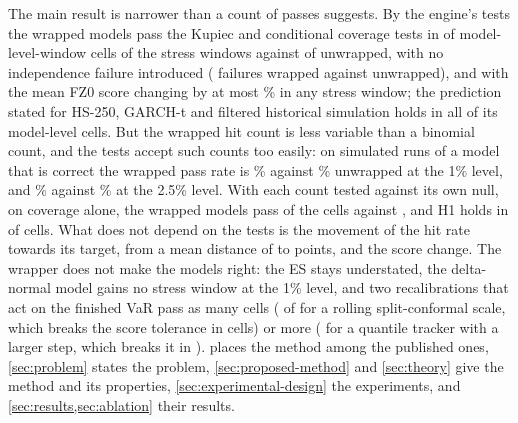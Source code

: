 The main result is narrower than a count of passes suggests. By the engine's tests the wrapped models pass the Kupiec and conditional coverage tests in \tenPassAci{} of \tenRuns{} model-level-window cells of the stress windows against \tenPassUnw{} of \tenRuns{} unwrapped, with no independence failure introduced (\tenIndFailAci{} failures wrapped against \tenIndFailUnw{} unwrapped), and with the mean FZ0 score changing by at most \tenWorstFz\% in any stress window; the prediction stated for HS-250, GARCH-t and filtered historical simulation holds in all \hypCells{} of its model-level cells. But the wrapped hit count is less variable than a binomial count, and the tests accept such counts too easily: on simulated runs of a model that is correct the wrapped pass rate is \dispBOneOneAciPass\% against \dispBOneOneUnwPass\% unwrapped at the 1\% level, and \dispBTwoHalfOneAciPass\% against \dispBTwoHalfOneUnwPass\% at the 2.5\% level. With each count tested against its own null, on coverage alone, the wrapped models pass \dispCWrapCal{} of the \dispCCells{} cells against \dispCUnwExact{}, and H1 holds in \dispCHoneGainCal{} of \hypCells{} cells. What does not depend on the tests is the movement of the hit rate towards its target, from a mean distance of \tenHitDevUnw{} to \tenHitDevAci{} points, and the score change. The wrapper does not make the models right: the ES stays understated, the delta-normal model gains no stress window at the 1\% level, and two recalibrations that act on the finished VaR pass as many cells (\cmpRollTenPass{} of \cmpRollTenN{} for a rolling split-conformal scale, which breaks the score tolerance in \cmpRollTenFzOver{} cells) or more (\cmpTrkLargeTenPass{} for a quantile tracker with a larger step, which breaks it in \cmpTrkLargeTenFzOver{}).  places the method among the published ones, \cref{sec:problem} states the problem, \cref{sec:proposed-method} and \cref{sec:theory} give the method and its properties, \cref{sec:experimental-design} the experiments, and \cref{sec:results,sec:ablation} their results.
